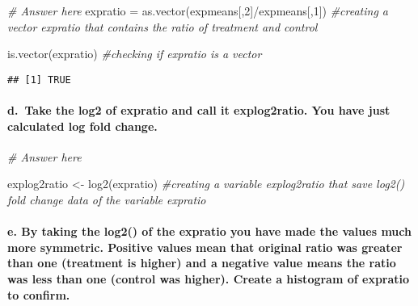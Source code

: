 \documentclass[
]{article}
\newenvironment{Shaded}{\begin{snugshade}}{\end{snugshade}}
\newcommand{\CommentTok}[1]{\textcolor[rgb]{0.56,0.35,0.01}{\textit{#1}}}
\newcommand{\DecValTok}[1]{\textcolor[rgb]{0.00,0.00,0.81}{#1}}
\newcommand{\FunctionTok}[1]{\textcolor[rgb]{0.00,0.00,0.00}{#1}}
\newcommand{\NormalTok}[1]{#1}
\newcommand{\OtherTok}[1]{\textcolor[rgb]{0.56,0.35,0.01}{#1}}
\newcommand{\SpecialCharTok}[1]{\textcolor[rgb]{0.00,0.00,0.00}{#1}}
\begin{document}
\begin{Shaded}
\begin{Highlighting}[]
\CommentTok{\# Answer here}
\NormalTok{expratio }\OtherTok{=} \FunctionTok{as.vector}\NormalTok{(expmeans[,}\DecValTok{2}\NormalTok{]}\SpecialCharTok{/}\NormalTok{expmeans[,}\DecValTok{1}\NormalTok{]) }\CommentTok{\#creating a vector expratio that contains the ratio of treatment and control}

\FunctionTok{is.vector}\NormalTok{(expratio) }\CommentTok{\#checking if expratio is a vector}
\end{Highlighting}
\end{Shaded}

\begin{verbatim}
## [1] TRUE
\end{verbatim}

\hypertarget{d.-take-the-log2-of-expratio-and-call-it-explog2ratio.-you-have-just-calculated-log-fold-change.}{%
\paragraph{d.~Take the log2 of expratio and call it explog2ratio. You
have just calculated log fold
change.}\label{d.-take-the-log2-of-expratio-and-call-it-explog2ratio.-you-have-just-calculated-log-fold-change.}}

\begin{Shaded}
\begin{Highlighting}[]
\CommentTok{\# Answer here}

\NormalTok{explog2ratio }\OtherTok{\textless{}{-}} \FunctionTok{log2}\NormalTok{(expratio) }\CommentTok{\#creating a variable explog2ratio that save log2() fold change data of the variable expratio}
\end{Highlighting}
\end{Shaded}

\hypertarget{e.-by-taking-the-log2-of-the-expratio-you-have-made-the-values-much-more-symmetric.-positive-values-mean-that-original-ratio-was-greater-than-one-treatment-is-higher-and-a-negative-value-means-the-ratio-was-less-than-one-control-was-higher.-create-a-histogram-of-expratio-to-confirm.}{%
\paragraph{e. By taking the log2() of the expratio you have made the
values much more symmetric. Positive values mean that original ratio was
greater than one (treatment is higher) and a negative value means the
ratio was less than one (control was higher). Create a histogram of
expratio to
confirm.}\label{e.-by-taking-the-log2-of-the-expratio-you-have-made-the-values-much-more-symmetric.-positive-values-mean-that-original-ratio-was-greater-than-one-treatment-is-higher-and-a-negative-value-means-the-ratio-was-less-than-one-control-was-higher.-create-a-histogram-of-expratio-to-confirm.}}
\end{document}
